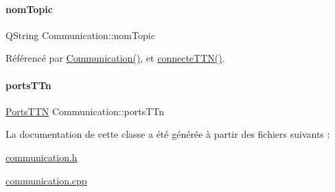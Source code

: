 \paragraph{\texorpdfstring{nom\+Topic}{nomTopic}}
{\footnotesize\ttfamily Q\+String Communication\+::nom\+Topic\hspace{0.3cm}{\ttfamily [private]}}



Référencé par \hyperlink{class_communication_a7376830f5598b7e3c0eb4434a8a8766e}{Communication()}, et \hyperlink{class_communication_af71587fb1ee9b7460345b7c12372a1eb}{connecte\+T\+T\+N()}.

\mbox{\label{class_communication_aba7a5df723bc632b957b4358bef8605e}} 
\paragraph{\texorpdfstring{ports\+T\+Tn}{portsTTn}}
{\footnotesize\ttfamily \hyperlink{parametres_8h_a0fe68caa1e9147addc96657cc822b937}{Ports\+T\+TN} Communication\+::ports\+T\+Tn\hspace{0.3cm}{\ttfamily [private]}}



La documentation de cette classe a été générée à partir des fichiers suivants \+:\begin{DoxyCompactItemize}
\item 
\hyperlink{communication_8h}{communication.\+h}\item 
\hyperlink{communication_8cpp}{communication.\+cpp}\end{DoxyCompactItemize}
